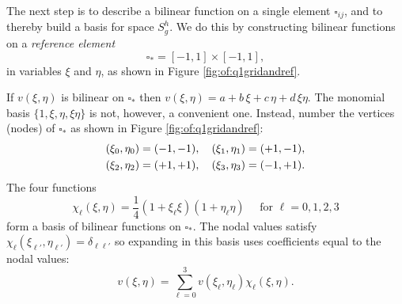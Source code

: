 The next step is to describe a bilinear function on a single element $\square_{ij}$, and to thereby build a basis for space $S_g^h$.  We do this by constructing bilinear functions on a \emph{reference element}
    $$\square_\ast = [-1,1]\times[-1,1],$$
in variables $\xi$ and $\eta$, as shown in Figure \ref{fig:of:q1gridandref}.

If $v(\xi,\eta)$ is bilinear on $\square_\ast$ then $v(\xi,\eta) = a + b\, \xi + c\, \eta + d\, \xi \eta$.  The monomial basis $\{1,\xi,\eta,\xi\eta\}$ is not, however, a convenient one.  Instead, number the vertices (nodes) of $\square_\ast$ as shown in Figure \ref{fig:of:q1gridandref}:
\begin{align}
(\xi_0,\eta_0) &= (-1,-1), \quad (\xi_1,\eta_1) = (+1,-1),    \label{eq:of:refcorners} \\
(\xi_2,\eta_2) &= (+1,+1), \quad (\xi_3,\eta_3) = (-1,+1). \notag
\end{align}
The four functions
\begin{equation}
\chi_\ell(\xi,\eta) = \frac{1}{4} \left(1 + \xi_\ell \xi\right) \left(1 + \eta_\ell \eta\right)  \quad \text{ for } \ell=0,1,2,3 \label{eq:of:chidefn}
\end{equation}
form a basis of bilinear functions on $\square_\ast$.  The nodal values satisfy $\chi_\ell(\xi_{\ell'},\eta_{\ell'}) = \delta_{\ell\ell'}$ so expanding in this basis uses coefficients equal to the nodal values:
\begin{equation}
v(\xi,\eta) = \sum_{\ell=0}^3 v(\xi_\ell,\eta_\ell) \chi_\ell(\xi,\eta). \label{eq:of:bilinearrepresentationref}
\end{equation}

